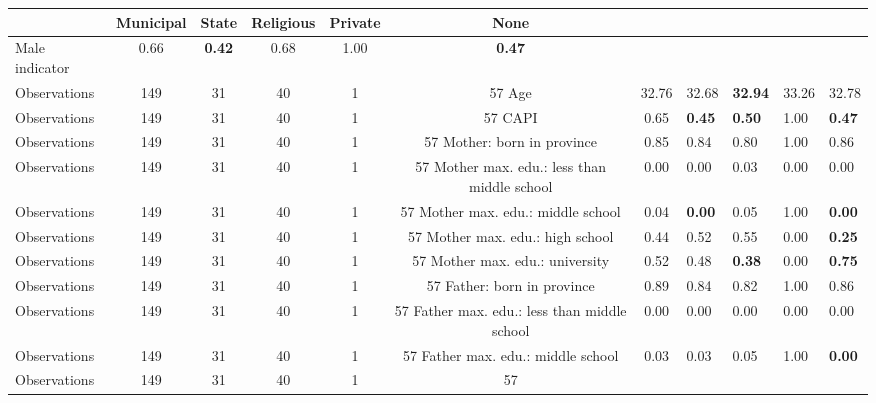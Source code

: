 \begin{tabular}{l c c c c c c }
\toprule
& \textbf{Municipal} & \textbf{State} & \textbf{Religious} & \textbf{Private} & \textbf{None} \\
\midrule
Male indicator &      0.66 & \textbf{     0.42} &      0.68 &      1.00 & \textbf{     0.47} \\
\midrule
Observations &       149 &        31 &        40 &         1 &        57
Age &     32.76 &     32.68 & \textbf{    32.94} &     33.26 &     32.78 \\
\midrule
Observations &       149 &        31 &        40 &         1 &        57
CAPI &      0.65 & \textbf{     0.45} & \textbf{     0.50} &      1.00 & \textbf{     0.47} \\
\midrule
Observations &       149 &        31 &        40 &         1 &        57
Mother: born in province &      0.85 &      0.84 &      0.80 &      1.00 &      0.86 \\
\midrule
Observations &       149 &        31 &        40 &         1 &        57
Mother max. edu.: less than middle school &      0.00 &      0.00 &      0.03 &      0.00 &      0.00 \\
\midrule
Observations &       149 &        31 &        40 &         1 &        57
Mother max. edu.: middle school &      0.04 & \textbf{     0.00} &      0.05 &      1.00 & \textbf{     0.00} \\
\midrule
Observations &       149 &        31 &        40 &         1 &        57
Mother max. edu.: high school &      0.44 &      0.52 &      0.55 &      0.00 & \textbf{     0.25} \\
\midrule
Observations &       149 &        31 &        40 &         1 &        57
Mother max. edu.: university &      0.52 &      0.48 & \textbf{     0.38} &      0.00 & \textbf{     0.75} \\
\midrule
Observations &       149 &        31 &        40 &         1 &        57
Father: born in province &      0.89 &      0.84 &      0.82 &      1.00 &      0.86 \\
\midrule
Observations &       149 &        31 &        40 &         1 &        57
Father max. edu.: less than middle school &      0.00 &      0.00 &      0.00 &      0.00 &      0.00 \\
\midrule
Observations &       149 &        31 &        40 &         1 &        57
Father max. edu.: middle school &      0.03 &      0.03 &      0.05 &      1.00 & \textbf{     0.00} \\
\midrule
Observations &       149 &        31 &        40 &         1 &        57

\end{tabular}

